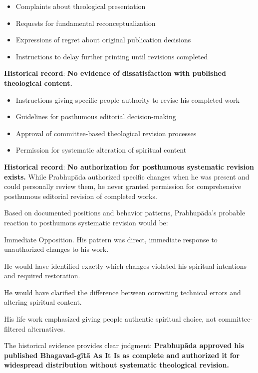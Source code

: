 \documentclass[12pt,twoside]{book}
\begin{document}
\begin{itemize}
\item Complaints about theological presentation
\item Requests for fundamental reconceptualization
\item Expressions of regret about original publication decisions
\item Instructions to delay further printing until revisions completed
\end{itemize}

\textbf{\textbf{Historical record}}: \textbf{\textbf{No evidence of dissatisfaction with published theological content.}}

\begin{itemize}
\item Instructions giving specific people authority to revise his completed work
\item Guidelines for posthumous editorial decision-making
\item Approval of committee-based theological revision processes
\item Permission for systematic alteration of spiritual content
\end{itemize}

\textbf{\textbf{Historical record}}: \textbf{\textbf{No authorization for posthumous systematic revision exists.}} While Prabhupāda authorized specific changes when he was present and could personally review them, he never granted permission for comprehensive posthumous editorial revision of completed works.

Based on documented positions and behavior patterns, Prabhupāda's probable reaction to posthumous systematic revision would be:

Immediate Opposition. His pattern was direct, immediate response to unauthorized changes to his work.

He would have identified exactly which changes violated his spiritual intentions and required restoration.

He would have clarified the difference between correcting technical errors and altering spiritual content.

His life work emphasized giving people authentic spiritual choice, not committee-filtered alternatives.

The historical evidence provides clear judgment: \textbf{\textbf{Prabhupāda approved his published Bhagavad-gītā As It Is as complete and authorized it for widespread distribution without systematic theological revision.}}
\end{document}
